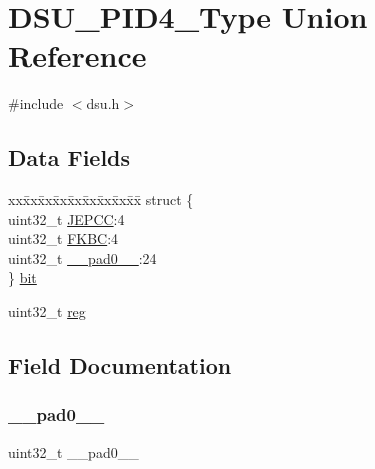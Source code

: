 \hypertarget{union_d_s_u___p_i_d4___type}{}\section{D\+S\+U\+\_\+\+P\+I\+D4\+\_\+\+Type Union Reference}
\label{union_d_s_u___p_i_d4___type}


{\ttfamily \#include $<$dsu.\+h$>$}

\subsection*{Data Fields}
\begin{DoxyCompactItemize}
\item 
\begin{tabbing}
xx\=xx\=xx\=xx\=xx\=xx\=xx\=xx\=xx\=\kill
struct \{\\
\>uint32\_t \mbox{\hyperlink{union_d_s_u___p_i_d4___type_a2ba9c1edf4631b95ad43c26007a2343b}{JEPCC}}:4\\
\>uint32\_t \mbox{\hyperlink{union_d_s_u___p_i_d4___type_a45b73f7720c1b8b402d327cdf09ed7e7}{FKBC}}:4\\
\>uint32\_t \mbox{\hyperlink{union_d_s_u___p_i_d4___type_a3e57c2ef1c3ffb36722f000cc1156824}{\_\_pad0\_\_}}:24\\
\} \mbox{\hyperlink{union_d_s_u___p_i_d4___type_af8879b4d351e037d0a77898b3fb681b9}{bit}}\\

\end{tabbing}\item 
uint32\+\_\+t \mbox{\hyperlink{union_d_s_u___p_i_d4___type_a6b91636401516a477989a336376d7b40}{reg}}
\end{DoxyCompactItemize}


\subsection{Field Documentation}
\mbox{\label{union_d_s_u___p_i_d4___type_a3e57c2ef1c3ffb36722f000cc1156824}} 
\subsubsection{\texorpdfstring{\_\_pad0\_\_}{\_\_pad0\_\_}}
{\footnotesize\ttfamily uint32\+\_\+t \+\_\+\+\_\+pad0\+\_\+\+\_\+}

